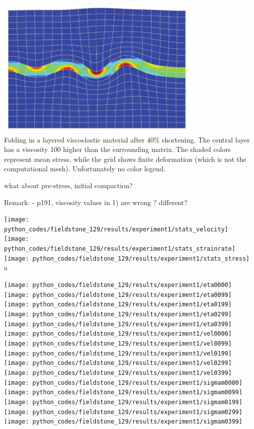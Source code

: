 \begin{center}
\includegraphics[width=10cm]{python_codes/fieldstone_129/images/simpson2}\\
{\captionfont 
Folding in a layered viscoelastic material after 40\% shortening. The central 
layer has a viscosity 100 higher than the surrounding matrix. The shaded colors 
represent mean stress, while the grid shows finite deformation 
(which is not the computational mesh). Unfortunately no color legend.}
\end{center}

what about pre-stress, initial compaction?

Remark:
- p191, viscosity values in 1) are wrong ? different?



\begin{center}
\texttt{[image: python\_codes/fieldstone\_129/results/experiment1/stats\_velocity]}
\texttt{[image: python\_codes/fieldstone\_129/results/experiment1/stats\_strainrate]}
\texttt{[image: python\_codes/fieldstone\_129/results/experiment1/stats\_stress]}\\
{\captionfont a}
\end{center} 


\begin{center}
\texttt{[image: python\_codes/fieldstone\_129/results/experiment1/eta0000]}
\texttt{[image: python\_codes/fieldstone\_129/results/experiment1/eta0099]}
\texttt{[image: python\_codes/fieldstone\_129/results/experiment1/eta0199]}
\texttt{[image: python\_codes/fieldstone\_129/results/experiment1/eta0299]}
\texttt{[image: python\_codes/fieldstone\_129/results/experiment1/eta0399]}\\
\texttt{[image: python\_codes/fieldstone\_129/results/experiment1/vel0000]}
\texttt{[image: python\_codes/fieldstone\_129/results/experiment1/vel0099]}
\texttt{[image: python\_codes/fieldstone\_129/results/experiment1/vel0199]}
\texttt{[image: python\_codes/fieldstone\_129/results/experiment1/vel0299]}
\texttt{[image: python\_codes/fieldstone\_129/results/experiment1/vel0399]}\\
\texttt{[image: python\_codes/fieldstone\_129/results/experiment1/sigmam0000]}
\texttt{[image: python\_codes/fieldstone\_129/results/experiment1/sigmam0099]}
\texttt{[image: python\_codes/fieldstone\_129/results/experiment1/sigmam0199]}
\texttt{[image: python\_codes/fieldstone\_129/results/experiment1/sigmam0299]}
\texttt{[image: python\_codes/fieldstone\_129/results/experiment1/sigmam0399]}\\
\end{center}

